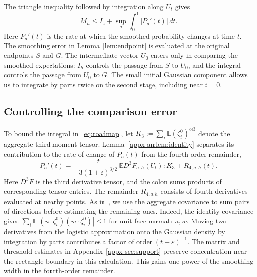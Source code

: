 \documentclass[11pt,letterpaper]{article}
\newenvironment{recovered}{\color{magenta}}{}
\theoremstyle{remark}
\newcommand{\E}{\mathbb E}
\begin{document}
\begin{recovered}
The triangle inequality followed by integration along \(U_t\) gives
\end{recovered}
\begin{equation}
 M_h\le I_h+\sup_a\int_0^1|P_a'(t)|\,dt .
 \label{eq:roadmap}
\end{equation}
Here \(P_a'(t)\) is the rate at which the smoothed probability changes
at time \(t\).
\begin{recovered}
The smoothing error in Lemma~\ref{lem:endpoint} is evaluated at the
original endpoints \(S\) and \(G\). The intermediate vector \(U_0\)
enters only in comparing the smoothed expectations: \(I_h\) controls
the passage from \(S\) to \(U_0\), and the integral controls the passage
from \(U_0\) to \(G\).
\end{recovered}
The small initial Gaussian component allows us to
integrate by parts twice on the second stage, including near \(t=0\).

\subsection{Controlling the comparison error}
\label{sec:outline-seeded}

To bound the integral in~\eqref{eq:roadmap}, let
\(K_3:=\sum_i\E(\zeta_i^0)^{\otimes3}\) denote the aggregate
third-moment tensor. Lemma~\ref{appx-an:lem:identity} separates its contribution
to the rate of change of \(P_a(t)\) from the fourth-order remainder,
\begin{equation}
 P_a'(t)=
 -\frac{t}{3(1+\varepsilon)^{3/2}}\,
       \E D^3F_{a,h}(U_t):K_3+R_{4,a,h}(t).
 \label{eq:path-summary}
\end{equation}
Here \(D^3F\) is the third derivative tensor, and the colon sums
products of corresponding tensor entries. The remainder \(R_{4,a,h}\) consists of fourth derivatives evaluated
at nearby points. As in~\cite[Lemmas~22--23]{GaoZhang}, we use the aggregate
covariance to sum pairs of directions before estimating the remaining
ones. Indeed, the identity covariance gives
\(\sum_i\E|(u\cdot\zeta_i^0)(w\cdot\zeta_i^0)|\le1\) for unit face
normals \(u,w\). Moving two derivatives from the logistic approximation
onto the Gaussian density by integration by parts contributes a
factor of order \((t+\varepsilon)^{-1}\). The matrix and threshold estimates
in Appendix~\ref{appx-sec:support} preserve concentration near the
rectangle boundary in this calculation. This gains one power of the
smoothing width in the fourth-order remainder.
\end{document}
